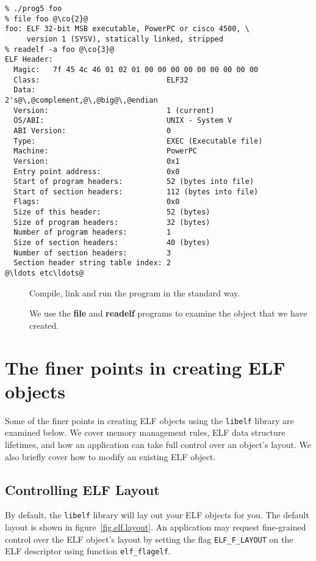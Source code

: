 \documentclass[a4paper,pdftex]{book}
\makeatletter
\newcommand{\constant}[1]{\texttt{#1}}
\newcommand{\function}[1]{\texttt{#1}}
\newcommand{\library}[1]{\texttt{#1}}
\newcommand{\tool}[1]{\textbf{#1}}
\newenvironment{callout}[2][black]{%
  \begingroup\newcommand{\@cocolor}{#1}%
  \setlength{\shadowsize}{1.2pt}%
  \newcommand{\@cogroup}[1]{#2}}{\endgroup}
\newcommand{\@co}[1]{\shadowbox{\color{\@cocolor}#1}}
\newcommand{\co}[1]{%
  \hypertarget{\@cogroup.#1.co}{%
    \hyperlink{\@cogroup.#1.cr}{\@co{#1}}}}
\newcommand{\coref}[1]{%
  \hypertarget{\@cogroup.#1.cr}{%
    \hyperlink{\@cogroup.#1.co}{\@co{#1}}}}
\makeatother
\begin{document}
\begin{callout}{scr5}
  \begin{lstlisting}[language={}, basicstyle=\small\ttfamily,
      label=scr.prog5, caption=Compiling and Running prog5]
% cc -o prog5 prog5.c -lelf @\co{1}@
% ./prog5 foo
% file foo @\co{2}@
foo: ELF 32-bit MSB executable, PowerPC or cisco 4500, \
     version 1 (SYSV), statically linked, stripped
% readelf -a foo @\co{3}@
ELF Header:
  Magic:   7f 45 4c 46 01 02 01 00 00 00 00 00 00 00 00 00
  Class:                             ELF32
  Data:                              2's@\,@complement,@\,@big@\,@endian
  Version:                           1 (current)
  OS/ABI:                            UNIX - System V
  ABI Version:                       0
  Type:                              EXEC (Executable file)
  Machine:                           PowerPC
  Version:                           0x1
  Entry point address:               0x0
  Start of program headers:          52 (bytes into file)
  Start of section headers:          112 (bytes into file)
  Flags:                             0x0
  Size of this header:               52 (bytes)
  Size of program headers:           32 (bytes)
  Number of program headers:         1
  Size of section headers:           40 (bytes)
  Number of section headers:         3
  Section header string table index: 2
@\ldots etc\ldots@
  \end{lstlisting}

  \begin{description}
  \item[\coref{1}] Compile, link and run the program in the standard
    way.
  \item[\coref{2} \coref{3}] We use the \tool{file} and \tool{readelf}
    programs to examine the object that we have created.
  \end{description}
\end{callout}

\section{The finer points in creating ELF objects}

Some of the finer points in creating ELF objects using the
\library{libelf} library are examined below.  We cover memory
management rules, ELF data structure lifetimes, and how an application
can take full control over an object's layout.  We also briefly cover
how to modify an existing ELF object.

\subsection{Controlling ELF Layout}
By default, the \library{libelf} library will lay out your ELF objects
for you.  The default layout is shown in figure~\vref{fig.elf.layout}.%
\index{object~creation!default~layout}%
An application may request fine-grained control over the ELF object's
layout by setting the flag \constant{ELF\_F\_LAYOUT} on the ELF
descriptor using function \function{elf\_flagelf}.%
\end{document}
